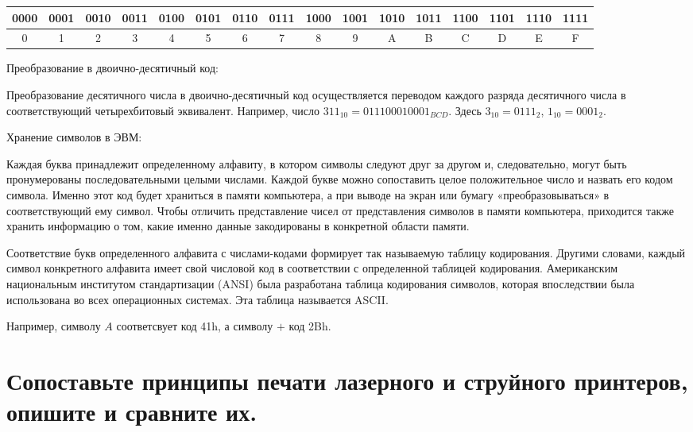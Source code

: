 \documentclass[unicode, 12pt, a4paper, oneside]{article}
\begin{document}
\begin{center}
\small
\begin{tabular}{|c|c|c|c|c|c|c|c|c|c|c|c|c|c|c|c|}
\hline 0000 & 0001 & 0010 & 0011 & 0100 & 0101 & 0110 & 0111 & 1000 & 1001 & 1010 & 1011 & 1100 & 1101 & 1110 & 1111 \\ 
\hline 0 & 1 & 2 & 3 & 4 & 5 & 6 & 7 & 8 & 9 & A & B & C & D & E & F \\ 
\hline 
\end{tabular}
\end{center}

Преобразование в двоично-десятичный код:

Преобразование десятичного числа в двоично-десятичный код осуществляется переводом каждого разряда десятичного числа в соответствующий четырехбитовый эквивалент. Например, число $ 311_{10} = 011100010001_{BCD} $. Здесь  $3_{10} = 0111_{2}$, $1_{10} = 0001_{2}$.

Хранение символов в ЭВМ:

Каждая буква принадлежит определенному алфавиту, в котором символы следуют друг за другом и, следовательно, могут быть пронумерованы последовательными целыми числами. Каждой букве можно сопоставить целое положительное число и назвать его кодом символа. Именно этот код будет храниться в памяти компьютера, а при выводе на экран или бумагу «преобразовываться» в соответствующий ему символ. Чтобы отличить представление чисел от представления символов в памяти компьютера, приходится также хранить информацию о том, какие именно данные закодированы в конкретной области памяти.

Соответствие букв определенного алфавита с числами-кодами формирует так называемую таблицу кодирования. Другими словами, каждый символ конкретного алфавита имеет свой числовой код в соответствии с определенной таблицей кодирования. Американским национальным институтом стандартизации (ANSI) была разработана таблица кодирования символов, которая впоследствии была использована во всех операционных системах. Эта таблица называется ASCII.

Например, символу $A$ соответсвует код 41h, а символу $+$ код 2Bh. 

\section{Сопоставьте принципы печати лазерного и струйного принтеров, опишите и сравните их.}
\end{document}
